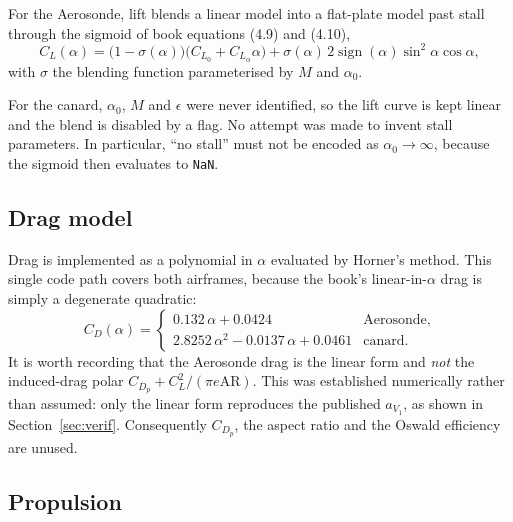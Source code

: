 \documentclass[11pt,a4paper]{article}
\begin{document}
For the Aerosonde, lift blends a linear model into a flat-plate model past stall
through the sigmoid of book equations (4.9) and (4.10),
\begin{equation}
  C_L(\alpha) = \bigl(1-\sigma(\alpha)\bigr)
                \bigl(C_{L_0} + C_{L_\alpha}\alpha\bigr)
              + \sigma(\alpha)\,
                2\operatorname{sign}(\alpha)\sin^2\!\alpha\cos\alpha ,
  \label{eq:blend}
\end{equation}
with $\sigma$ the blending function parameterised by $M$ and $\alpha_0$.

For the canard, $\alpha_0$, $M$ and $\epsilon$ were never identified, so the lift
curve is kept linear and the blend is disabled by a flag. No attempt was made to
invent stall parameters. In particular, ``no stall'' must not be encoded as
$\alpha_0\to\infty$, because the sigmoid then evaluates to \texttt{NaN}.

\subsection{Drag model}

Drag is implemented as a polynomial in $\alpha$ evaluated by Horner's method. This
single code path covers both airframes, because the book's linear-in-$\alpha$ drag
is simply a degenerate quadratic:
\begin{equation}
  C_D(\alpha) = \begin{cases}
    0.132\,\alpha + 0.0424 & \text{Aerosonde},\\
    2.8252\,\alpha^2 - 0.0137\,\alpha + 0.0461 & \text{canard}.
  \end{cases}
  \label{eq:dragpoly}
\end{equation}
It is worth recording that the Aerosonde drag is the linear form
and \emph{not} the induced-drag polar $C_{D_p} + C_L^2/(\pi e \mathrm{AR})$. This
was established numerically rather than assumed: only the linear form reproduces
the published $a_{V_1}$, as shown in Section~\ref{sec:verif}. Consequently
$C_{D_p}$, the aspect ratio and the Oswald efficiency are unused.

\subsection{Propulsion}
\end{document}

